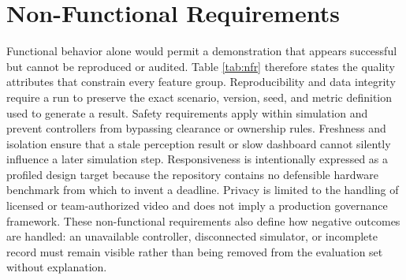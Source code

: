 \section{Non-Functional Requirements}

Functional behavior alone would permit a demonstration that appears successful but cannot be reproduced or audited. Table \ref{tab:nfr} therefore states the quality attributes that constrain every feature group. Reproducibility and data integrity require a run to preserve the exact scenario, version, seed, and metric definition used to generate a result. Safety requirements apply within simulation and prevent controllers from bypassing clearance or ownership rules. Freshness and isolation ensure that a stale perception result or slow dashboard cannot silently influence a later simulation step. Responsiveness is intentionally expressed as a profiled design target because the repository contains no defensible hardware benchmark from which to invent a deadline. Privacy is limited to the handling of licensed or team-authorized video and does not imply a production governance framework. These non-functional requirements also define how negative outcomes are handled: an unavailable controller, disconnected simulator, or incomplete record must remain visible rather than being removed from the evaluation set without explanation.

